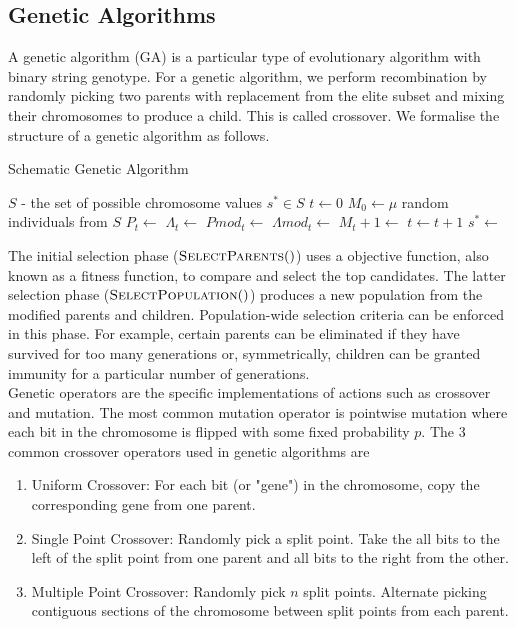 \subsection{Genetic Algorithms}

A genetic algorithm (GA) is a particular type of evolutionary algorithm with binary string genotype. For a genetic algorithm, we perform recombination by randomly picking two parents with replacement from the elite subset and mixing their chromosomes to produce a child. This is called crossover. We formalise the structure of a genetic algorithm as follows.\\

\begin{algorithm}
  \caption{Schematic Genetic Algorithm}\label{alg:ea}
  \begin{algorithmic}
  \Require $S$ - the set of possible chromosome values
  \Ensure $s^* \in S$
  \State $t \gets 0$
  \State $M_0 \gets \mu$ random individuals from $S$
    \State {}
    \State $P_t \gets$     
    \State $\Lambda_t \gets$   
    \State $Pmod_t \gets$ 
    \State $\Lambda mod_t \gets$ 
    \State $M_t+1 \gets$ 
    \State $t \gets t+1$
  \EndWhile
  \State $s^* \gets$ 
  \end{algorithmic}
\end{algorithm}

The initial selection phase ($\Call{SelectParents}$) uses a objective function, also known as a fitness function, to compare and select the top candidates. The latter selection phase ($\Call{SelectPopulation}$) produces a new population from the modified parents and children. Population-wide selection criteria can be enforced in this phase. For example, certain parents can be eliminated if they have survived for too many generations or, symmetrically, children can be granted immunity for a particular number of generations.\\

Genetic operators are the specific implementations of actions such as crossover and mutation. The most common mutation operator is pointwise mutation where each bit in the chromosome is flipped with some fixed probability $p$. The 3 common crossover operators used in genetic algorithms are
\begin{enumerate}
  \item Uniform Crossover: For each bit (or "gene") in the chromosome, copy the corresponding gene from one parent.
  \item Single Point Crossover: Randomly pick a split point. Take the all bits to the left of the split point from one parent and all bits to the right from the other.
  \item Multiple Point Crossover: Randomly pick $n$ split points. Alternate picking contiguous sections of the chromosome between split points from each parent.
\end{enumerate}


